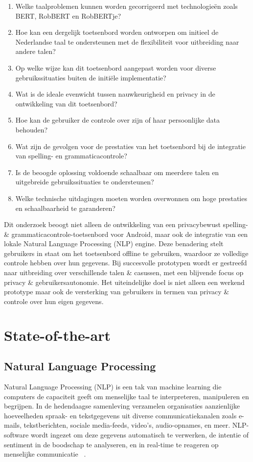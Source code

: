 \begin{enumerate}
    \item Welke taalproblemen kunnen worden gecorrigeerd met technologieën zoals BERT, RobBERT en RobBERTje?
    \item Hoe kan een dergelijk toetsenbord worden ontworpen om initieel de Nederlandse taal te ondersteunen met de flexibiliteit voor uitbreiding naar andere talen?
    \item Op welke wijze kan dit toetsenbord aangepast worden voor diverse gebruikssituaties buiten de initiële implementatie?
    \item Wat is de ideale evenwicht tussen nauwkeurigheid en privacy in de ontwikkeling van dit toetsenbord?
    \item Hoe kan de gebruiker de controle over zijn of haar persoonlijke data behouden?
    \item Wat zijn de gevolgen voor de prestaties van het toetsenbord bij de integratie van spelling- en grammaticacontrole?
    \item Is de beoogde oplossing voldoende schaalbaar om meerdere talen en uitgebreide gebruikssituaties te ondersteunen?
    \item Welke technische uitdagingen moeten worden overwonnen om hoge prestaties en sch\-aal\-baar\-heid te garanderen?
\end{enumerate}


Dit onderzoek beoogt niet alleen de ontwikkeling van een privacybewust spel\-ling- \& grammatica\-controle-toetsenbord voor Android, maar ook de integratie van een lokale Natural Language Processing (NLP) engine. Deze benadering stelt gebruikers in staat om het toetsenbord offline te gebruiken, waardoor ze volledige controle hebben over hun gegevens. Bij succesvolle prototypen wordt er gestreefd naar uitbreiding over verschillende talen \& casussen, met een blijvende focus op privacy \& gebruikersautonomie. Het uiteindelijke doel is niet alleen een werkend prototype maar ook de versterking van gebruikers in termen van privacy \& controle over hun eigen gegevens.


\section{State-of-the-art}%
\label{sec:state-of-the-art}

\subsection{Natural Language Processing}
Natural Language Processing (NLP) is een tak van machine learning die computers de capaciteit geeft om menselijke taal te interpreteren, manipuleren en begrijpen. In de hedendaagse samenleving verzamelen organisaties aanzienlijke hoeveelheden spraak- en tekstgegevens uit diverse communicatiekanalen zoals e-mails, tekstberichten, sociale media-feeds, video's, audio-op\-na\-mes, en meer. NLP-software wordt ingezet om deze gegevens automatisch te verwerken, de intentie of sentiment in de boodschap te analyseren, en in real-time te reageren op menselijke communicatie ~\autocite{AWSI2023}. 

